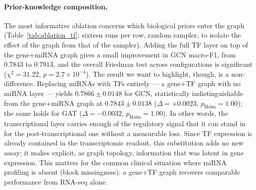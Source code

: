 \documentclass[review,3p,times,11pt, ]{elsarticle} %
\begin{document}
\paragraph{Prior-knowledge composition.}
The most informative ablation concerns which biological priors enter
the graph (Table~\ref{tab:ablation_tf}; sixteen runs per row, random
sampler, to isolate the effect of the graph from that of the sampler).
Adding the full TF layer on top of the gene+miRNA graph gives a small
improvement in GCN macro-F1, from $0.7843$ to $0.7913$, and the
overall Friedman test across configurations is significant
($\chi^2 = 31.22$, $p = 2.7\times10^{-4}$). The result we want to
highlight, though, is a non-difference. Replacing miRNAs with TFs
entirely — a gene+TF graph with no miRNA layer — yields
$0.7866 \pm 0.0148$ for GCN, statistically indistinguishable from the
gene+miRNA graph at $0.7843 \pm 0.0138$
($\Delta = +0.0023$, $p_{\text{Holm}} = 1.00$); the same holds for GAT
($\Delta = -0.0032$, $p_{\text{Holm}} = 1.00$). In other words, the
transcriptional layer carries enough of the regulatory signal that it
can stand in for the post-transcriptional one without a measurable
loss. Since TF expression is already contained in the transcriptomic
readout, this substitution adds no new assay; it makes explicit, as
graph topology, information that was latent in gene expression. This
matters for the common clinical situation where miRNA profiling is
absent (block missingness): a gene+TF graph recovers comparable
performance from RNA-seq alone.
\end{document}
